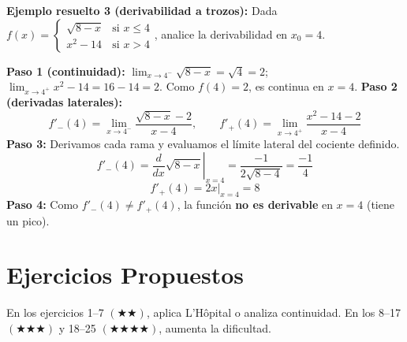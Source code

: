 \documentclass[12pt, letterpaper]{article}
\begin{document}
\noindent\textbf{Ejemplo resuelto 3 (derivabilidad a trozos):} Dada $f(x) = \begin{cases} \sqrt{8-x} & \text{si } x \le 4 \\ x^2 - 14 & \text{si } x > 4 \end{cases}$, analice la derivabilidad en $x_0 = 4$.

\begin{cuadrosolucion}
  \textbf{Paso 1 (continuidad):} $\lim_{x\to4^-}\sqrt{8-x} = \sqrt{4} = 2$; $\lim_{x\to4^+}x^2-14 = 16-14 = 2$. Como $f(4) = 2$, es continua en $x=4$.
  \textbf{Paso 2 (derivadas laterales):}
  \[
    f'_-(4) = \lim_{x\to4^-}\frac{\sqrt{8-x} - 2}{x-4}, \qquad
    f'_+(4) = \lim_{x\to4^+}\frac{x^2-14 - 2}{x-4}
  \]
  \textbf{Paso 3:} Derivamos cada rama y evaluamos el límite lateral del cociente definido.
  \[
    f'_-(4) = \left.\frac{d}{dx}\sqrt{8-x}\right|_{x=4} = \frac{-1}{2\sqrt{8-4}} = \frac{-1}{4}
  \]
  \[
    f'_+(4) = \left.2x\right|_{x=4} = 8
  \]
  \textbf{Paso 4:} Como $f'_-(4) \ne f'_+(4)$, la función \textbf{no es derivable} en $x=4$ (tiene un pico).
\end{cuadrosolucion}

\newpage
\section{Ejercicios Propuestos}

\noindent En los ejercicios 1--7 $(\bigstar\bigstar)$, aplica L'Hôpital o analiza continuidad. En los 8--17 $(\bigstar\bigstar\bigstar)$ y 18--25 $(\bigstar\bigstar\bigstar\bigstar)$, aumenta la dificultad.
\end{document}
